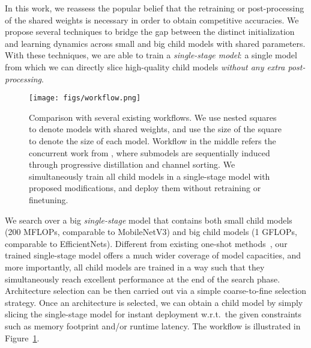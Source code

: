 \documentclass[runningheads]{llncs}
\begin{document}
In this work, we reassess the popular belief that the retraining or post-processing of the shared weights is necessary in order to obtain competitive accuracies. We propose several techniques to bridge the gap between the distinct initialization and learning dynamics across small and big child models with shared parameters. With these techniques, we are able to train a \textit{single-stage model}: a single model from which we can directly slice high-quality child models \emph{without any extra post-processing}.

\begin{figure}[tb!]
\centering
\texttt{[image: figs/workflow.png]}
\caption{Comparison with several existing workflows. We use nested squares to denote models with shared weights, and use the size of the square to denote the size of each model. Workflow in the middle refers the concurrent work from \cite{cai2019once}, where submodels are sequentially induced through progressive distillation and channel sorting. We simultaneously train all child models in a single-stage model with proposed modifications, and deploy them without retraining or finetuning.
}
\label{figs:schematic}
\end{figure}

We search over a big \emph{single-stage} model that contains both small child models (200 MFLOPs, comparable to MobileNetV3) and big child models (1 GFLOPs, comparable to EfficientNets). Different from existing one-shot methods~\cite{bender2018understanding,liu2018darts,brock2018smash,pham2018efficient,yu2019network}, our trained single-stage model offers a much wider coverage of model capacities, and more importantly, all child models are trained in a way such that they simultaneously reach excellent performance at the end of the search phase. Architecture selection can be then carried out via a simple coarse-to-fine selection strategy. Once an architecture is selected, we can obtain a child model by simply slicing the single-stage model for instant deployment w.r.t.\ the given constraints such as memory footprint and/or runtime latency. The workflow is illustrated in Figure~\ref{figs:schematic}.
\end{document}
